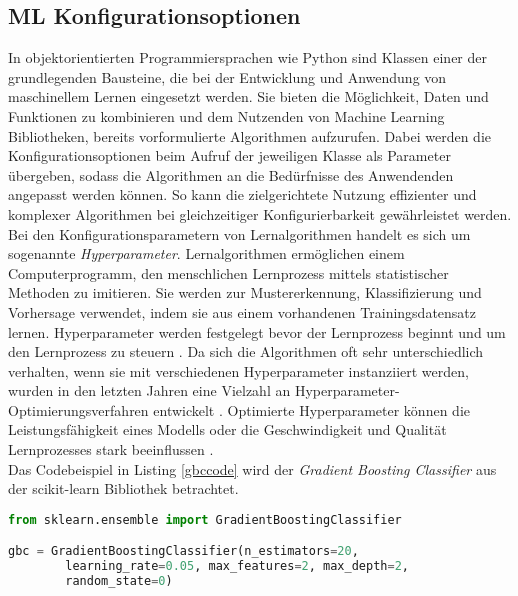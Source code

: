 \documentclass[german,bachelor]{swsLeipzig}
\begin{document}
\subsection{ML Konfigurationsoptionen} \label{ML Konfigurationsoptionen}
In objektorientierten Programmiersprachen wie Python sind Klassen einer der grundlegenden Bausteine, die bei der Entwicklung und Anwendung
von maschinellem Lernen eingesetzt werden.
Sie bieten die Möglichkeit, Daten und Funktionen zu kombinieren und dem Nutzenden von Machine Learning Bibliotheken,
bereits vorformulierte Algorithmen aufzurufen.
Dabei werden die Konfigurationsoptionen beim Aufruf der jeweiligen Klasse als Parameter übergeben, sodass die Algorithmen
an die Bedürfnisse des Anwendenden angepasst werden können.
So kann die zielgerichtete Nutzung effizienter und komplexer Algorithmen bei gleichzeitiger Konfigurierbarkeit gewährleistet werden. \\
\indent Bei den Konfigurationsparametern von Lernalgorithmen handelt es sich um sogenannte \textit{Hyperparameter}.
Lernalgorithmen ermöglichen einem Computerprogramm, den menschlichen Lernprozess mittels statistischer Methoden zu imitieren.
Sie werden zur Mustererkennung, Klassifizierung und Vorhersage verwendet, indem sie aus einem vorhandenen Trainingsdatensatz
lernen.
Hyperparameter werden festgelegt bevor der Lernprozess beginnt und um den Lernprozess zu steuern \cite[]{hype}.
Da sich die Algorithmen oft sehr unterschiedlich verhalten, wenn sie mit verschiedenen Hyperparameter instanziiert werden,
wurden in den letzten Jahren eine Vielzahl an Hyperparameter-Optimierungsverfahren entwickelt \cite[]{pmlr-v32-hutter14}.
Optimierte Hyperparameter können die Leistungsfähigkeit eines Modells oder die Geschwindigkeit und Qualität Lernprozesses stark beeinflussen \cite[]{hype}.\\

Das Codebeispiel in Listing \ref{gbccode} wird der \textit{Gradient Boosting Classifier} aus der scikit-learn Bibliothek betrachtet.\\

\noindent\begin{minipage}{\linewidth}
\begin{lstlisting}[language=Python, frame=single, label=gbccode, basicstyle=\small, caption={Nutzung der GradientBoostingClassifier-Klasse aus scikit-learn},captionpos=b]
from sklearn.ensemble import GradientBoostingClassifier

gbc = GradientBoostingClassifier(n_estimators=20,
        learning_rate=0.05, max_features=2, max_depth=2,
        random_state=0)
\end{lstlisting}
\end{minipage}
\
\end{document}
